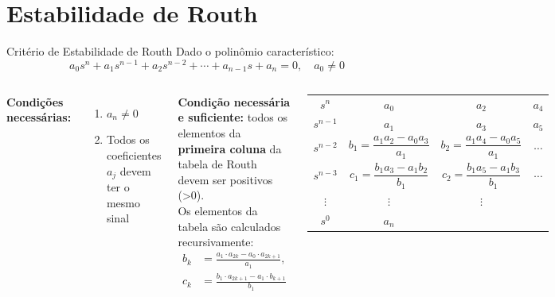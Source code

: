 \section{Estabilidade de Routh}

\begin{frame}{Critério de Estabilidade de Routh}
  \scriptsize
  Dado o polinômio característico:
  $$a_0 s^n + a_1 s^{n-1} + a_2 s^{n-2} + \cdots + a_{n-1} s + a_n = 0, \quad a_0 \neq 0$$
  \begin{columns}
    \textbf{Condições necessárias:}
    \begin{enumerate}
      \item $a_n \neq 0$
      \item Todos os coeficientes $a_j$ devem ter o mesmo sinal
    \end{enumerate}
    \textbf{Condição necessária e suficiente:} todos os elementos da \textbf{primeira coluna} da tabela de Routh devem ser positivos (>0). \\
    \vspace{0.3cm}
    Os elementos da tabela são calculados recursivamente:
    \begin{align*}
      b_k &= \frac{a_1 \cdot a_{2k} - a_0 \cdot a_{2k+1}}{a_1}, \\
      c_k &= \frac{b_1 \cdot a_{2k+1} - a_1 \cdot b_{k+1}}{b_1}
    \end{align*}
    \small
    \begin{center}
      \begin{tabular}{c|ccc}
        $s^n$     & $a_0$ & $a_2$ & $a_4$ \\
        $s^{n-1}$ & $a_1$ & $a_3$ & $a_5$ \\
        $s^{n-2}$ & $b_1 = \dfrac{a_1 a_2 - a_0 a_3}{a_1}$
        & $b_2 = \dfrac{a_1 a_4 - a_0 a_5}{a_1}$
        & $\cdots$ \\
        $s^{n-3}$ & $c_1 = \dfrac{b_1 a_3 - a_1 b_2}{b_1}$
        & $c_2 = \dfrac{b_1 a_5 - a_1 b_3}{b_1}$
        & $\cdots$ \\
        $\vdots$  & $\vdots$ & $\vdots$ & \\
        $s^0$     & $a_n$ & & \\
      \end{tabular}
    \end{center}
  \end{columns}
\end{frame}


